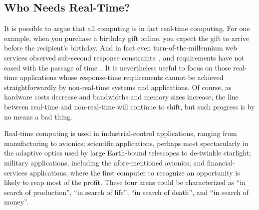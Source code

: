 \fi

\subsection{Who Needs Real-Time?}
\label{sec:advsync:Who Needs Real-Time?}

It is possible to argue that all computing is in fact real-time computing.
For one example, when you purchase a birthday gift online, you expect
the gift to arrive before the recipient's birthday.
And in fact even turn-of-the-millennium web services observed sub-second
response constraints~\cite{KristofferBohmann2001a}, and requirements have
not eased with the passage of time~\cite{DeCandia:2007:DAH:1323293.1294281}.
It is nevertheless useful to focus on those real-time applications
whose response-time requirements cannot be achieved straightforwardly
by non-real-time systems and applications.
Of course, as hardware costs decrease and bandwidths and memory sizes
increase, the line between real-time and non-real-time will continue
to shift, but such progress is by no means a bad thing.

\QuickQuizEnd

Real-time computing is used in industrial-control applications, ranging from
manufacturing to avionics;
scientific applications, perhaps most spectacularly in the adaptive
optics used by
large Earth-bound telescopes to de-twinkle starlight;
military applications, including the afore-mentioned avionics;
and financial-services applications, where the first computer to recognize
an opportunity is likely to reap most of the profit.
These four areas could be characterized as ``in search of production'',
``in search of life'', ``in search of death'', and ``in search of money''.

